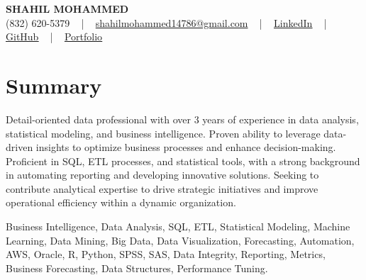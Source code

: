 \documentclass[letterpaper,10pt]{article}
\begin{document}
\begin{center}
    {\fontsize{14pt}{12pt}\selectfont \textbf{\MakeUppercase{Shahil Mohammed}}}\\ \vspace{2pt}
    \fontsize{10pt}{12pt}\selectfont (832) 620-5379 ~ | ~ \href{mailto:shahilmohammed14786@gmail.com}{shahilmohammed14786@gmail.com} ~ | ~  
    \href{https://www.linkedin.com/in/shahil-mohammed-9652931a1/}{\color{blue}\underline{LinkedIn}}  ~ | ~ 
    \href{https://github.com/freakbeast14}{\color{blue}\underline{GitHub}} ~ | ~ 
    \href{https://shahil-mohammed.netlify.app/}{\color{blue}\underline{Portfolio}}
    \vspace{-8pt}
\end{center}

\section{Summary}
\vspace{-2pt}\fontsize{8pt}{9pt}\selectfont
Detail-oriented data professional with over 3 years of experience in data analysis, statistical modeling, and business intelligence. Proven ability to leverage data-driven insights to optimize business processes and enhance decision-making. Proficient in SQL, ETL processes, and statistical tools, with a strong background in automating reporting and developing innovative solutions. Seeking to contribute analytical expertise to drive strategic initiatives and improve operational efficiency within a dynamic organization.
 \vspace{-5pt}
 
{\fontsize{1pt}{1pt}\selectfont\color{white}
Business Intelligence, Data Analysis, SQL, ETL, Statistical Modeling, Machine Learning, Data Mining, Big Data, Data Visualization, Forecasting, Automation, AWS, Oracle, R, Python, SPSS, SAS, Data Integrity, Reporting, Metrics, Business Forecasting, Data Structures, Performance Tuning.
}
\vspace{-8pt}

\vspace{-2pt}
\end{document}
